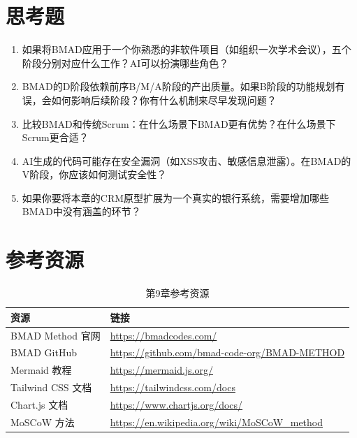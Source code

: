 \section{思考题}

\begin{exercisebox}[思考与讨论]
\begin{enumerate}[leftmargin=2em]
  \item 如果将BMAD应用于一个你熟悉的非软件项目（如组织一次学术会议），五个阶段分别对应什么工作？AI可以扮演哪些角色？
  \item BMAD的D阶段依赖前序B/M/A阶段的产出质量。如果B阶段的功能规划有误，会如何影响后续阶段？你有什么机制来尽早发现问题？
  \item 比较BMAD和传统Scrum：在什么场景下BMAD更有优势？在什么场景下Scrum更合适？
  \item AI生成的代码可能存在安全漏洞（如XSS攻击、敏感信息泄露）。在BMAD的V阶段，你应该如何测试安全性？
  \item 如果你要将本章的CRM原型扩展为一个真实的银行系统，需要增加哪些BMAD中没有涵盖的环节？
\end{enumerate}
\end{exercisebox}

\section{参考资源}

\begin{table}[H]
\centering
\begin{tabular}{ll}
\toprule
\textbf{资源} & \textbf{链接} \\
\midrule
BMAD Method 官网 & \url{https://bmadcodes.com/} \\
BMAD GitHub & \url{https://github.com/bmad-code-org/BMAD-METHOD} \\
Mermaid 教程 & \url{https://mermaid.js.org/} \\
Tailwind CSS 文档 & \url{https://tailwindcss.com/docs} \\
Chart.js 文档 & \url{https://www.chartjs.org/docs/} \\
MoSCoW 方法 & \url{https://en.wikipedia.org/wiki/MoSCoW_method} \\
\bottomrule
\end{tabular}
\caption{第9章参考资源}
\end{table}
